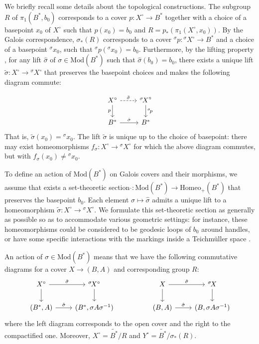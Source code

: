 \documentclass[10pt]{amsart}
\theoremstyle{definition}
\begin{document}
We briefly recall some details about the topological constructions. The subgroup $R$ of $\pi_1(B^*,b_0)$ corresponds to a cover $p\colon X^\circ \rightarrow B^*$ together with a choice of a basepoint $x_0$ of $X^\circ$ such that $p(x_0) = b_0$ and $R=p_*(\pi_1(X^\circ,x_0))$. 
By the Galois correspondence, $\sigma_*(R)$ corresponds to a cover ${^\sigma p} \colon {^\sigma \! X}^\circ \rightarrow B^*$ and a choice of a basepoint ${^\sigma \! x_0}$, such that ${^\sigma \! p}({^\sigma \! x_0}) = b_0$. 
Furthermore, by the lifting property \cite[13.5]{MR1343250}, for any lift $\hat{\sigma}$ of $\sigma \in \mathrm{Mod}(B^*)$ such that $\hat{\sigma}(b_0) = b_0$, there exists a unique lift $\tilde{\sigma} \colon X^\circ \rightarrow {^\sigma \! X}^\circ$ that preserves the basepoint choices and makes the following diagram commute:

\begin{equation} \label{eq:sigma_tilde_top}
    \begin{tikzcd}
X^\circ \arrow[r, "\tilde{\sigma}", dashed] \arrow[d, "p"'] & {^\sigma \! X}^\circ \arrow[d, "{^\sigma \! p}"] \\
B^* \arrow[r, "\hat{\sigma}"] & B^*  
\end{tikzcd}
\end{equation}
That is, $\tilde{\sigma}(x_0) = {^\sigma \! x_0}$. The lift $\tilde{\sigma}$ is unique up to the choice of basepoint: there may exist homeomorphisms $f_\sigma \colon X^\circ \rightarrow {^\sigma \! X}^\circ $ for which the above diagram commutes, but with $f_\sigma(x_0) \neq {^\sigma x_0}$.


To define an action of $\mathrm{Mod}(B^*)$ on Galois covers and their morphisms, we assume that exists a set-theoretic section $ \hat{} : \mathrm{Mod}(B^*) \rightarrow \mathrm{Homeo}_+(B^*)$ that preserves the basepoint $b_0$. Each element $\sigma\mapsto \hat\sigma$ admits a unique lift to a homeomorphism $\tilde\sigma \colon X^\circ \rightarrow {^\sigma \! X}^\circ$. We formulate this set-theoretic section as generally as possible so as to accommodate various geometric settings: for instance, these homeomorphisms could be considered to be geodesic loops of $b_0$ around handles, or have some specific interactions with the markings inside a Teichmüller space \cite[Ch.1]{MR2006093}.

An action of $\sigma \in \mathrm{Mod}(B^*)$ means that we have the following commutative diagrams for a cover $X \to (B,A)$ and corresponding group $R$:
\begin{equation*}
    \begin{tikzcd}
        X^\circ  \arrow[d]\arrow[r, "\tilde{\sigma}"] & ^\sigma \! X^{\circ} \arrow[d] & &
        X  \arrow[d]\arrow[r, "\tilde{\sigma}"] & ^\sigma \! X \arrow[d]\\
        (B^*,A) \arrow[r, "\hat{\sigma}"] & (B^*, {\sigma  A \sigma^{-1}}) & & (B,A) \arrow[r, "\hat{\sigma}"] & (B, {\sigma  A \sigma^{-1}})
    \end{tikzcd}
\end{equation*}
where the left diagram corresponds to the open cover and the right to the compactified one. 
Moreover, $X^\circ  = \widetilde{B^*}/R$ and $ Y^{\circ} = \widetilde{B^*}/\sigma_*(R) $. 
\end{document}
